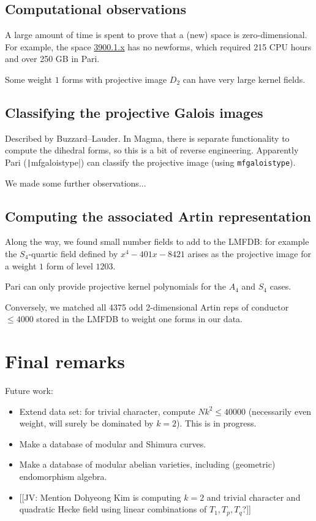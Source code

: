 \documentclass[11pt]{amsart}
\numberwithin{equation}{subsection}
\theoremstyle{plain}
\theoremstyle{definition}
\newcommand{\jv}[1]{{\color{red} \textsf{[[JV: #1]]}}}
\begin{document}
\subsection{Computational observations}

A large amount of time is spent to prove that a (new) space is zero-dimensional.  For example, the space \href{http://cmfs.lmfdb.xyz/ModularForm/GL2/Q/holomorphic/3900/1/x/}{3900.1.x} has no newforms, which required 215 CPU hours and over 250 GB in Pari.  

Some weight $1$ forms with projective image $D_2$ can have very large kernel fields.

\subsection{Classifying the projective Galois images}

Described by Buzzard--Lauder.  In Magma, there is separate functionality to compute the dihedral forms, so this is a bit of reverse engineering.  Apparently Pari (\texttt|mfgaloistype|) can classify the projective image (using \verb|mfgaloistype|).

We made some further observations...

\subsection{Computing the associated Artin representation}

Along the way, we found small number fields to add to the LMFDB: for example the $S_4$-quartic field defined by $x^4-401x-8421$ arises as the projective image for a weight $1$ form of level $1203$.

Pari can only provide projective kernel polynomials for the $A_4$ and $S_4$ cases.  

Conversely, we matched all 4375 odd 2-dimensional Artin reps of conductor $\leq 4000$ stored in the LMFDB to weight one forms in our data.

\section{Final remarks} \label{sec:conclusion}

Future work:
\begin{itemize}
\item Extend data set: for trivial character, compute $Nk^2 \leq 40000$ (necessarily even weight, will surely be dominated by $k=2$).  This is in progress.
\item Make a database of modular and Shimura curves.
\item Make a database of modular abelian varieties, including (geometric) endomorphism algebra.
\item \jv{Mention Dohyeong Kim is computing $k=2$ and trivial character and quadratic Hecke field using linear combinations of $T_1,T_p,T_q$?}
\end{itemize}
\end{document}
